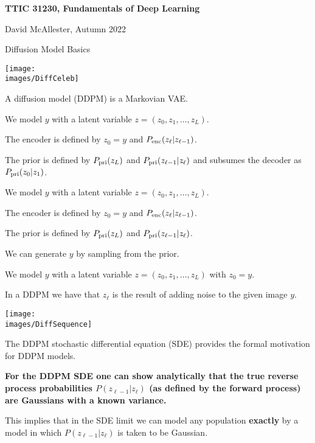 





{\Huge

  \centerline{\bf TTIC 31230, Fundamentals of Deep Learning}
  \bigskip
  \centerline{David McAllester, Autumn 2022}
  \vfill
  \vfil
  \centerline{Diffusion Model Basics}
  \vfill
  \vfill


\centerline{\texttt{[image: \\images/DiffCeleb]}}



A diffusion model (DDPM) is a Markovian VAE.

\vfill
We model $y$ with a latent variable $z =(z_0,z_1,\dots,z_{L})$.

\vfill
The encoder is defined by $z_0 = y$ and $P_{\mathrm{enc}}(z_\ell|z_{\ell-1})$.

\vfill
The prior is defined by $P_{\mathrm{pri}}(z_L)$ and $P_{\mathrm{pri}}(z_{\ell-1}|z_{\ell})$ and subsumes the decoder as $P_{\mathrm{pri}}(z_0|z_1)$.


We model $y$ with a latent variable $z =(z_0,z_1,\dots,z_{L})$.

\vfill
The encoder is defined by $z_0 = y$ and $P_{\mathrm{enc}}(z_\ell|z_{\ell-1})$.

\vfill
The prior is defined by $P_{\mathrm{pri}}(z_L)$ and $P_{\mathrm{pri}}(z_{\ell-1}|z_{\ell})$.

\vfill
We can generate $y$ by sampling from the prior.


We model $y$ with a latent variable $z =(z_0,z_1,\dots,z_{L})$ with $z_0 = y$.

\vfill
In a DDPM we have that $z_\ell$ is the result of adding noise to the given image $y$.

\centerline{\texttt{[image: \\images/DiffSequence]}}



The DDPM stochastic differential equation (SDE) provides the formal motivation for DDPM models.

\vfill
{\bf For the DDPM SDE one can show analytically that the true reverse process probabilities  $P(z_{\ell-1}|z_\ell)$ (as defined by the forward process)
are Gaussians with a known variance.}

\vfill
This implies that in the SDE limit we can model any population {\bf exactly} by a model in which $P(z_{\ell-1}|z_\ell)$ is taken to be Gaussian.

}
